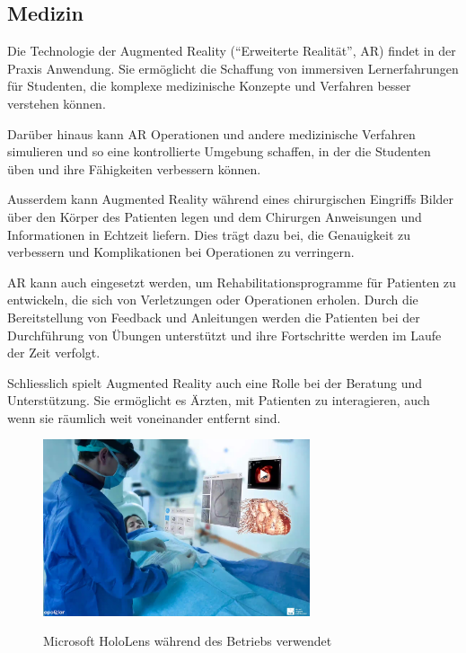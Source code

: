 \subsection{Medizin}
Die Technologie der Augmented Reality (“Erweiterte Realität”, AR) findet in der Praxis Anwendung. Sie ermöglicht die Schaffung von immersiven Lernerfahrungen für Studenten, die komplexe medizinische Konzepte und Verfahren besser verstehen können. \cite{Parsons2021CurrentPO}

Darüber hinaus kann AR Operationen und andere medizinische Verfahren simulieren und so eine kontrollierte Umgebung schaffen, in der die Studenten üben und ihre Fähigkeiten verbessern können. \cite{Parsons2021CurrentPO}

Ausserdem kann Augmented Reality während eines chirurgischen Eingriffs Bilder über den Körper des Patienten legen und dem Chirurgen Anweisungen und Informationen in Echtzeit liefern. Dies trägt dazu bei, die Genauigkeit zu verbessern und Komplikationen bei Operationen zu verringern. \cite{Parsons2021CurrentPO}

AR kann auch eingesetzt werden, um Rehabilitationsprogramme für Patienten zu entwickeln, die sich von Verletzungen oder Operationen erholen. Durch die Bereitstellung von Feedback und Anleitungen werden die Patienten bei der Durchführung von Übungen unterstützt und ihre Fortschritte werden im Laufe der Zeit verfolgt. \cite{cavalcanti2018usability}

Schliesslich spielt Augmented Reality auch eine Rolle bei der Beratung und Unterstützung. Sie ermöglicht es Ärzten, mit Patienten zu interagieren, auch wenn sie räumlich weit voneinander entfernt sind. \cite{Hsieh2018PreliminarySO}

\vspace{1cm}

\begin{figure}[h!]
    \centering
    \includegraphics[width=0.7\textwidth]{attachments/surgery.jpeg}
    \caption{Microsoft HoloLens während des Betriebs verwendet} \cite{Microsoft_Healthcare}
\end{figure}

